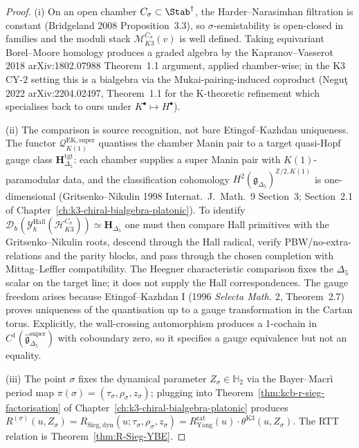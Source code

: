 \begin{proof}
(i) On an open chamber $C_\sigma\subset\Stab^\dagger$, the
Harder--Narasimhan filtration is constant (Bridgeland 2008 Proposition~3.3),
so $\sigma$-semistability is open-closed in families and the moduli
stack $\mathcal{M}^{C_\sigma}_{K3}(v)$ is well defined. Taking equivariant
Borel--Moore homology produces a graded algebra by the Kapranov--Vasserot
2018 \textup{arXiv:1802.07988} Theorem~1.1 argument, applied
chamber-wise; in the K3 CY-$2$ setting this is a bialgebra via the
Mukai-pairing-induced coproduct (Negu\c{t} 2022
\textup{arXiv:2204.02497}, Theorem~1.1 for the K-theoretic refinement
which specialises back to ours under
$K^\bullet\mapsto H^\bullet$).

(ii) The comparison is source recognition, not bare
Etingof--Kazhdan uniqueness. The functor
$\mathcal{Q}^{\mathrm{EK,super}}_{K(1)}$ quantises the chamber Manin
pair to a target quasi-Hopf gauge class
$\mathbf{H}_{\Delta_5}^{\mathrm{tgt}}$: each chamber supplies a super
Manin pair with $K(1)$-paramodular data, and the classification
cohomology
$H^2(\mathfrak{g}_{\Delta_5})^{\mathbb{Z}/2,K(1)}$ is one-dimensional
(Gritsenko--Nikulin 1998 \textup{Internat.\ J.\ Math.}~9 Section~3;
Section~2.1 of Chapter~\ref{ch:k3-chiral-bialgebra-platonic}). To
identify
$\mathcal{D}_\hbar(\mathcal{Y}^{\mathrm{Hall}}_\hbar(\mathcal{H}^{C_\sigma}_{K3}))\simeq
\mathbf{H}_{\Delta_5}$ one must then compare Hall primitives with the
Gritsenko--Nikulin roots, descend through the Hall radical, verify
PBW/no-extra-relations and the parity blocks, and pass through the
chosen completion with Mittag--Leffler compatibility. The Heegner
characteristic comparison fixes the $\Delta_5$ scalar on the target
line; it does not supply the Hall correspondences. The gauge freedom
arises because Etingof--Kazhdan I (1996 \emph{Selecta Math.} 2,
Theorem~2.7) proves uniqueness of the quantisation up to a gauge
transformation in the Cartan torus. Explicitly, the wall-crossing
automorphism produces a 1-cochain in
$C^1(\widehat{\mathfrak{g}}_{\Delta_5}^{\mathrm{super}})$ with
coboundary zero, so it specifies a gauge equivalence but not an equality.

(iii) The point $\sigma$ fixes the dynamical parameter
$Z_\sigma\in\mathbb{H}_2$ via the Bayer--Macr\`i period map
$\pi(\sigma)=(\tau_\sigma,\rho_\sigma,z_\sigma)$; plugging into
Theorem~\ref{thm:kcb-r-sieg-factorisation} of
Chapter~\ref{ch:k3-chiral-bialgebra-platonic} produces
$R^{(\sigma)}(u,Z_\sigma)=R_{\mathrm{Sieg,dyn}}(u;\tau_\sigma,
\rho_\sigma,z_\sigma)
=R^{\mathrm{rat}}_{\mathrm{Yang}}(u)\cdot\theta^{\mathrm{K3}}(u,Z_\sigma)$.
The RTT relation is Theorem~\ref{thm:R-Sieg-YBE}.
\end{proof}

